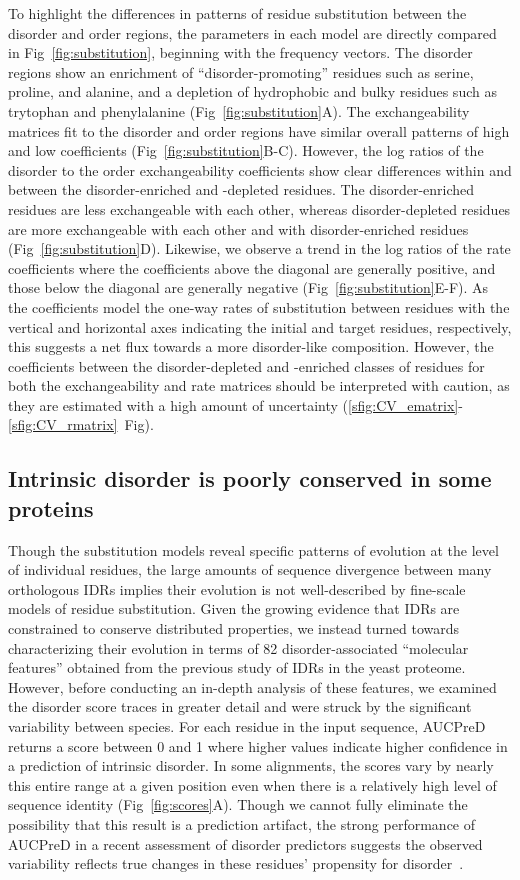 To highlight the differences in patterns of residue substitution between the disorder and order regions, the parameters in each model are directly compared in Fig~\ref{fig:substitution}, beginning with the frequency vectors. The disorder regions show an enrichment of ``disorder-promoting'' residues such as serine, proline, and alanine, and a depletion of hydrophobic and bulky residues such as trytophan and phenylalanine (Fig~\ref{fig:substitution}A). The exchangeability matrices fit to the disorder and order regions have similar overall patterns of high and low coefficients (Fig~\ref{fig:substitution}B-C). However, the log ratios of the disorder to the order exchangeability coefficients show clear differences within and between the disorder-enriched and -depleted residues. The disorder-enriched residues are less exchangeable with each other, whereas disorder-depleted residues are more exchangeable with each other and with disorder-enriched residues (Fig~\ref{fig:substitution}D). Likewise, we observe a trend in the log ratios of the rate coefficients where the coefficients above the diagonal are generally positive, and those below the diagonal are generally negative (Fig~\ref{fig:substitution}E-F). As the coefficients model the one-way rates of substitution between residues with the vertical and horizontal axes indicating the initial and target residues, respectively, this suggests a net flux towards a more disorder-like composition. However, the coefficients between the disorder-depleted and -enriched classes of residues for both the exchangeability and rate matrices should be interpreted with caution, as they are estimated with a high amount of uncertainty (\ref{sfig:CV_ematrix}-\ref{sfig:CV_rmatrix}~Fig).

\subsection{Intrinsic disorder is poorly conserved in some proteins}
Though the substitution models reveal specific patterns of evolution at the level of individual residues, the large amounts of sequence divergence between many orthologous IDRs implies their evolution is not well-described by fine-scale models of residue substitution. Given the growing evidence that IDRs are constrained to conserve distributed properties, we instead turned towards characterizing their evolution in terms of 82 disorder-associated ``molecular features'' obtained from the previous study of IDRs in the yeast proteome. However, before conducting an in-depth analysis of these features, we examined the disorder score traces in greater detail and were struck by the significant variability between species. For each residue in the input sequence, AUCPreD returns a score between 0 and 1 where higher values indicate higher confidence in a prediction of intrinsic disorder. In some alignments, the scores vary by nearly this entire range at a given position even when there is a relatively high level of sequence identity (Fig~\ref{fig:scores}A). Though we cannot fully eliminate the possibility that this result is a prediction artifact, the strong performance of AUCPreD in a recent assessment of disorder predictors suggests the observed variability reflects true changes in these residues' propensity for disorder~\cite{Necci2021}.


